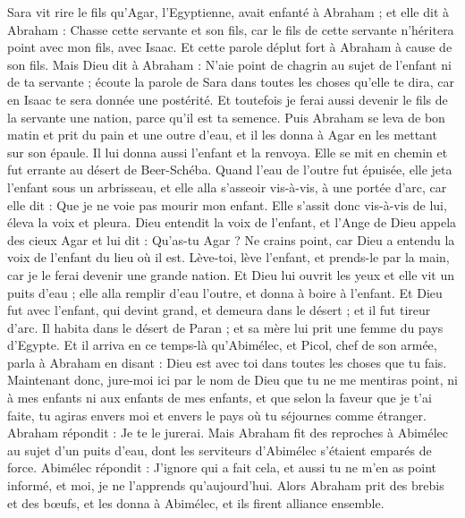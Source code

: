 \begin{multicols}{2}
Sara vit rire le fils qu'Agar, l'Egyptienne, avait enfanté à Abraham ;
et elle dit à Abraham : Chasse cette servante et son fils, car le fils de cette servante n'héritera point avec mon fils, avec Isaac.
Et cette parole déplut fort à Abraham à cause de son fils.
Mais Dieu dit à Abraham : N'aie point de chagrin au sujet de l'enfant ni de ta servante ; écoute la parole de Sara dans toutes les choses qu'elle te dira, car en Isaac te sera donnée une postérité.
Et toutefois je ferai aussi devenir le fils de la servante une nation, parce qu'il est ta semence.
Puis Abraham se leva de bon matin et prit du pain et une outre d'eau, et il les donna à Agar en les mettant sur son épaule. Il lui donna aussi l'enfant et la renvoya. Elle se mit en chemin et fut errante au désert de Beer-Schéba.
Quand l'eau de l'outre fut épuisée, elle jeta l'enfant sous un arbrisseau,
et elle alla s'asseoir vis-à-vis, à une portée d'arc, car elle dit : Que je ne voie pas mourir mon enfant. Elle s'assit donc vis-à-vis de lui, éleva la voix et pleura.
Dieu entendit la voix de l'enfant, et l'Ange de Dieu appela des cieux Agar et lui dit : Qu'as-tu Agar ? Ne crains point, car Dieu a entendu la voix de l'enfant du lieu où il est.
Lève-toi, lève l'enfant, et prends-le par la main, car je le ferai devenir une grande nation.
Et Dieu lui ouvrit les yeux et elle vit un puits d'eau ; elle alla remplir d'eau l'outre, et donna à boire à l'enfant.
Et Dieu fut avec l'enfant, qui devint grand, et demeura dans le désert ; et il fut tireur d'arc.
Il habita dans le désert de Paran ; et sa mère lui prit une femme du pays d'Egypte.
Et il arriva en ce temps-là qu'Abimélec, et Picol, chef de son armée, parla à Abraham en disant : Dieu est avec toi dans toutes les choses que tu fais.
Maintenant donc, jure-moi ici par le nom de Dieu que tu ne me mentiras point, ni à mes enfants ni aux enfants de mes enfants, et que selon la faveur que je t'ai faite, tu agiras envers moi et envers le pays où tu séjournes comme étranger.
Abraham répondit : Je te le jurerai.
Mais Abraham fit des reproches à Abimélec au sujet d'un puits d'eau, dont les serviteurs d'Abimélec s'étaient emparés de force.
Abimélec répondit : J'ignore qui a fait cela, et aussi tu ne m'en as point informé, et moi, je ne l'apprends qu'aujourd'hui.
Alors Abraham prit des brebis et des bœufs, et les donna à Abimélec, et ils firent alliance ensemble.

\end{multicols}
